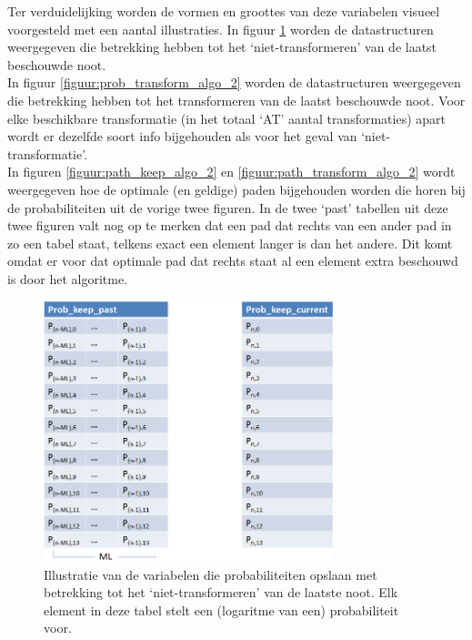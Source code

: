 Ter verduidelijking worden de vormen en groottes van deze variabelen visueel voorgesteld met een aantal illustraties. In figuur \ref{figuur:prob_keep_algo_2} worden de datastructuren weergegeven die betrekking hebben tot het `niet-transformeren' van de laatst beschouwde noot.\\ 
In figuur \ref{figuur:prob_transform_algo_2} worden de datastructuren weergegeven die betrekking hebben tot het transformeren van de laatst beschouwde noot. Voor elke beschikbare transformatie (in het totaal `AT' aantal transformaties) apart wordt er dezelfde soort info bijgehouden als voor het geval van `niet-transformatie'.\\ 
In figuren \ref{figuur:path_keep_algo_2} en \ref{figuur:path_transform_algo_2} wordt weergegeven hoe de optimale (en geldige) paden bijgehouden worden die horen bij de probabiliteiten uit de vorige twee figuren. In de twee `past' tabellen uit deze twee figuren valt nog op te merken dat een pad dat rechts van een ander pad in zo een tabel staat, telkens exact een element langer is dan het andere. Dit komt omdat er voor dat optimale pad dat rechts staat al een element extra beschouwd is door het algoritme.\\

\begin{figure}[!ht]
  \centering
  \includegraphics[width=0.75\textwidth]{4_Efficient_Toepassen_Transformatie/prob_keep_algo_2}
  \caption{Illustratie van de variabelen die probabiliteiten opslaan met betrekking tot het `niet-transformeren' van de laatste noot. Elk element in deze tabel stelt een (logaritme van een) probabiliteit voor.}
  \label{figuur:prob_keep_algo_2}
\end{figure}

